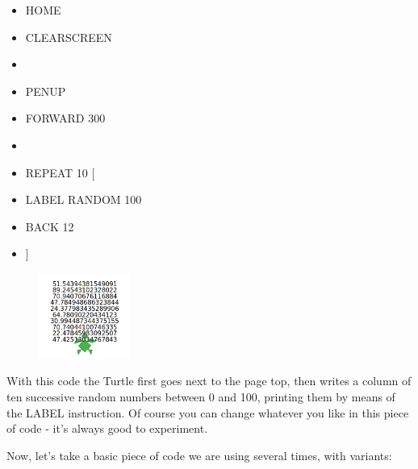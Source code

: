 \vskip 1cm

\begin{scriptsize}
\begin{minipage}{0.50\textwidth}
\begin{itemize}[itemsep=-3pt,parsep=2pt, leftmargin=-0.0mm ]
\item[] HOME
\item[] CLEARSCREEN 
\item[] 
\item[] PENUP
\item[] FORWARD 300
\item[] 
\item[] REPEAT 10 [
\item[] \hspace{8pt} LABEL RANDOM 100
\item[] \hspace{8pt} BACK 12
\item[] ]                      
\end{itemize}
\end{minipage}
\end{scriptsize}
\begin{minipage}{0.5\textwidth}
\begin{figure}[H]
   \includegraphics[width=3.0cm,trim=4 4 8 4,clip]{./images/caos-della-vita/caos-della-vita-1.png}
   \label{dec-2}
\end{figure}
\end{minipage} \hfill

\vskip 1cm

With this code the Turtle first goes next to the page top, then writes a column of ten successive random numbers between 0 and 100, printing them by means of the LABEL instruction. Of course you can change whatever you like in this piece of code - it's always good to experiment.

Now, let's take a basic piece of code we are using several times, with variants:

\vskip 1cm

